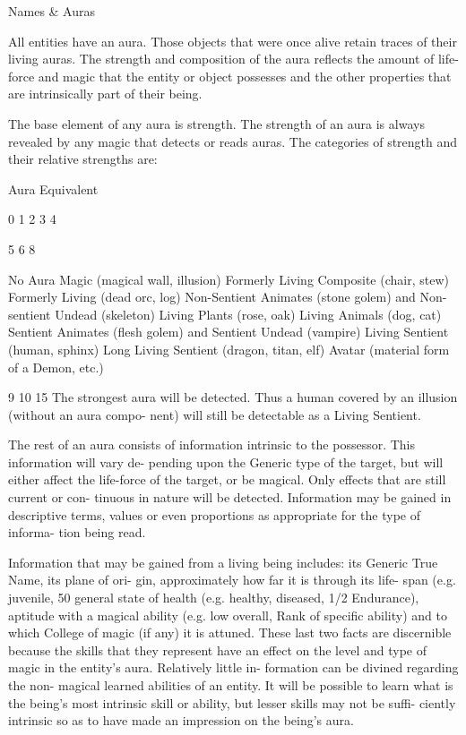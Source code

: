 \begin{Chapter}{Names \& Auras}

All  entities  have  an  aura.  Those  objects  that  were 
once  alive  retain  traces  of  their  living  auras.  The 
strength  and  composition  of  the  aura  reflects  the 
amount  of  life-force  and  magic  that  the  entity  or 
object  possesses  and  the  other  properties  that  are 
intrinsically part of their being. 

The  base  element  of  any  aura  is  strength.  The 
strength  of  an  aura  is  always  revealed  by  any 
magic that detects or reads auras. The categories of 
strength and their relative strengths are: 

Aura  Equivalent 

0 
1 
2 
3 
4 

5 
6 
8 

No Aura 
Magic (magical wall, illusion) 
Formerly Living Composite (chair, stew) 
Formerly Living (dead orc, log) 
Non-Sentient Animates (stone golem) and 
Non-sentient Undead (skeleton) 
Living Plants (rose, oak) 
Living Animals (dog, cat) 
Sentient Animates (flesh golem) and 
Sentient Undead (vampire) 
Living Sentient (human, sphinx) 
Long Living Sentient (dragon, titan, elf) 
Avatar (material form of a Demon, etc.) 

9 
10 
15 
The strongest aura will be detected. Thus a human 
covered  by  an  illusion  (without  an  aura  compo-
nent) will still be detectable as a Living Sentient. 

The rest of an aura consists of information intrinsic 
to  the  possessor.  This  information  will  vary  de-
pending  upon  the  Generic  type  of  the  target,  but 
will  either  affect  the  life-force  of  the  target,  or  be 
magical.  Only  effects  that  are  still  current  or  con-
tinuous in nature will be detected. Information may 
be  gained  in  descriptive  terms,  values  or  even 
proportions as appropriate for the type of informa-
tion being read. 

Information that may be gained from a living being 
includes:  its  Generic  True  Name,  its  plane  of  ori-
gin,  approximately  how  far  it  is  through  its  life-
span  (e.g.  juvenile,  50%
general  state  of  health  (e.g.  healthy,  diseased,  1/2 
Endurance),  aptitude  with  a  magical  ability  (e.g. 
low overall, Rank of specific ability) and to which 
College  of  magic  (if  any)  it  is  attuned.  These  last 
two  facts  are  discernible  because  the  skills  that 
they represent have an effect on the level and type 
of  magic  in  the  entity’s  aura.  Relatively  little  in-
formation  can  be  divined  regarding  the  non-
magical  learned  abilities  of  an  entity.  It  will  be 
possible to learn what is the being’s most intrinsic 
skill  or  ability,  but  lesser  skills  may  not  be  suffi-
ciently  intrinsic  so  as  to  have  made  an  impression 
on the being’s aura. 


\end{Chapter}
